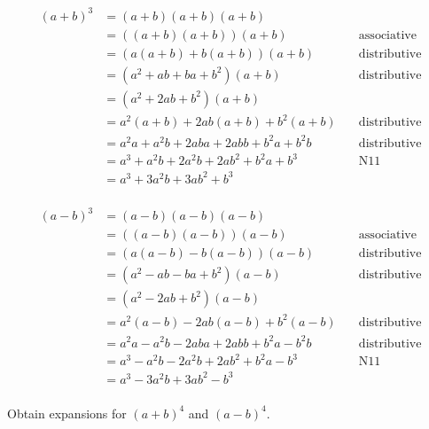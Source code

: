 \begin{align*}
{(a + b)}^3 &= (a + b)(a + b)(a + b) & \\
&= ((a + b)(a + b))(a + b) & \quad \text{associative} \\
&= (a(a + b) + b(a + b))(a + b) & \quad \text{distributive} \\
&= (a^2 + ab + ba + b^2)(a + b) & \quad \text{distributive} \\
&= (a^2 + 2ab + b^2)(a + b) & \quad \text{} \\
&= a^2(a + b) + 2ab(a + b) + b^2(a + b) & \quad \text{distributive} \\
&= a^2 a + a^2 b + 2ab a + 2ab b + b^2 a + b^2 b & \quad \text{distributive} \\
&= a^3 + a^2 b + 2 a^2 b + 2ab^2 + b^2 a + b^3 & \quad \text{N11} \\
&= a^3 + 3 a^2 b + 3ab^2 + b^3 & \quad \text{} \\
\end{align*}

\begin{align*}
{(a - b)}^3 &= (a - b)(a - b)(a - b) & \\
&= ((a - b)(a - b))(a - b) & \quad \text{associative} \\
&= (a(a - b) - b(a - b))(a - b) & \quad \text{distributive} \\
&= (a^2 - ab - ba + b^2)(a - b) & \quad \text{distributive} \\
&= (a^2 - 2ab + b^2)(a - b) & \quad \text{} \\
&= a^2(a - b) - 2ab(a - b) + b^2(a - b) & \quad \text{distributive} \\
&= a^2 a - a^2 b - 2ab a + 2ab b + b^2 a - b^2 b & \quad \text{distributive} \\
&= a^3 - a^2 b - 2 a^2 b + 2ab^2 + b^2 a - b^3 & \quad \text{N11} \\
&= a^3 - 3 a^2 b + 3ab^2 - b^3 & \quad \text{} \\
\end{align*}


\begin{tcolorbox}[title=Problem 3, breakable]
Obtain expansions for ${(a+b)}^4$ and ${(a-b)}^4$.
\end{tcolorbox}



